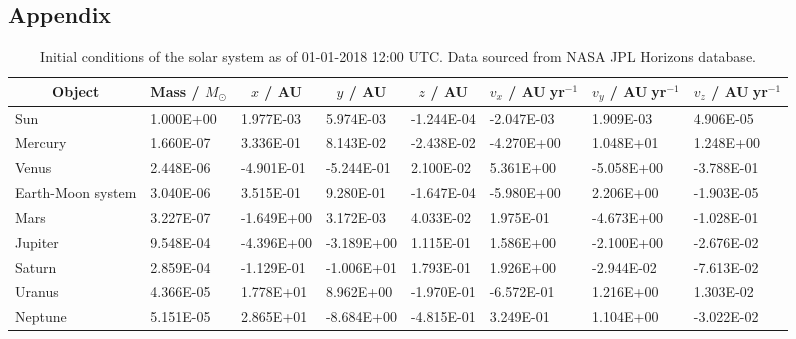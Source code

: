 \begin{appendix}
\chapter{Appendix}
\begin{sidewaystable}
\caption[Initial conditions]{Initial conditions of the solar system as of 01-01-2018 12:00 UTC. Data sourced from NASA JPL Horizons database.}\vspace{3ex}
\label{table:init_con}
\begin{tabular}{llllllll} \toprule \toprule
\multicolumn{1}{c}{Object} & \multicolumn{1}{c}{Mass / $M_{\odot}$} & \multicolumn{1}{c}{$x$ / AU} & \multicolumn{1}{c}{$y$ / AU} & \multicolumn{1}{c}{$z$ / AU} & \multicolumn{1}{c}{$v_x$ / AU$\;$yr$^{-1}$}& \multicolumn{1}{c}{$v_y$  / AU$\;$yr$^{-1}$}& \multicolumn{1}{c}{$v_z$  / AU$\;$yr$^{-1}$}\\ \midrule
Sun & 1.000E+00 & 1.977E-03 & 5.974E-03 & -1.244E-04 & -2.047E-03 & 1.909E-03 & 4.906E-05 \\
Mercury & 1.660E-07 & 3.336E-01 & 8.143E-02 & -2.438E-02 & -4.270E+00 & 1.048E+01 & 1.248E+00 \\
Venus & 2.448E-06 & -4.901E-01 & -5.244E-01 & 2.100E-02 & 5.361E+00 & -5.058E+00 & -3.788E-01 \\
Earth-Moon system & 3.040E-06 & 3.515E-01 & 9.280E-01 & -1.647E-04 & -5.980E+00 & 2.206E+00 & -1.903E-05 \\
Mars & 3.227E-07 & -1.649E+00 & 3.172E-03 & 4.033E-02 & 1.975E-01 & -4.673E+00 & -1.028E-01 \\
Jupiter & 9.548E-04 & -4.396E+00 & -3.189E+00 & 1.115E-01 & 1.586E+00 & -2.100E+00 & -2.676E-02 \\
Saturn & 2.859E-04 & -1.129E-01 & -1.006E+01 & 1.793E-01 & 1.926E+00 & -2.944E-02 & -7.613E-02 \\
Uranus & 4.366E-05 & 1.778E+01 & 8.962E+00 & -1.970E-01 & -6.572E-01 & 1.216E+00 & 1.303E-02 \\
Neptune & 5.151E-05 & 2.865E+01 & -8.684E+00 & -4.815E-01 & 3.249E-01 & 1.104E+00 & -3.022E-02 \\
\bottomrule
\end{tabular}
\end{sidewaystable}

\end{appendix}
